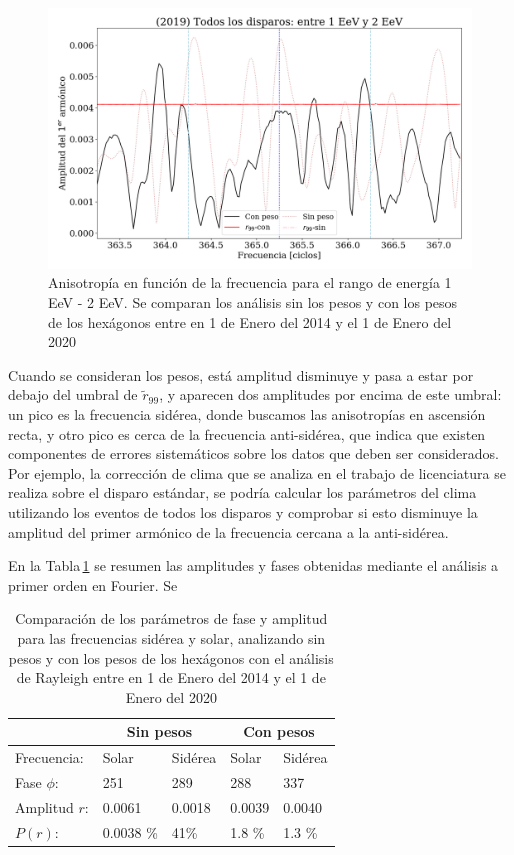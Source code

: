 		\begin{figure}[H]
			\centering
			\includegraphics[width=0.85\linewidth]{pesos_sin_con_1_2_EeV.png}
			\caption{Anisotropía en función de la frecuencia para el rango de energía 1  EeV - 2 EeV. Se comparan los análisis sin los pesos y con los pesos de los hexágonos entre en 1 de Enero del 2014 y el 1 de Enero del 2020}
			\label{anisotropia_rayleigh}
		\end{figure}

Cuando se consideran los pesos, está amplitud disminuye y pasa a estar por debajo del umbral de $\tilde{r}_{99}$, y aparecen dos amplitudes por encima de este umbral: un pico es la frecuencia sidérea, donde buscamos las anisotropías en ascensión recta, y otro pico es cerca de la frecuencia anti-sidérea, que indica que existen componentes de errores sistemáticos sobre los datos que deben ser considerados. Por ejemplo, la corrección de clima que se analiza en el trabajo de licenciatura se realiza sobre el disparo estándar, se podría calcular los parámetros del clima utilizando los eventos de todos los disparos y comprobar si esto disminuye la amplitud del primer armónico de la frecuencia cercana a la anti-sidérea.

		
En la Tabla\,\ref{table:parametros_rayleigh} se resumen las amplitudes y fases obtenidas mediante el análisis a primer orden en Fourier. Se
		\begin{table}[H]
		\centering
		\begin{tabular}{|l|l|l|l|l|}
			\cline{2-5}
			\multicolumn{1}{c|}{} & \multicolumn{2}{c|}{Sin pesos} & \multicolumn{2}{c|}{Con pesos} \\ \hline
			Frecuencia:           & Solar          & Sidérea       & Solar         & Sidérea        \\ \hline
			Fase $\phi$:          & 251            & 289           & 288           & 337            \\ \hline
			Amplitud $r$:         & 0.0061         & 0.0018        & 0.0039        & 0.0040         \\ \hline
			$P(r)$:               & 0.0038 \%       & 41\%          & 1.8 \%        & 1.3 \%       \\ \hline    
		\end{tabular}
		\caption{Comparación de los parámetros de fase y amplitud para las frecuencias sidérea y solar, analizando sin pesos y con los pesos de los hexágonos con el análisis de Rayleigh entre en 1 de Enero del 2014 y el 1 de Enero del 2020}
		\label{table:parametros_rayleigh}
		\end{table}


